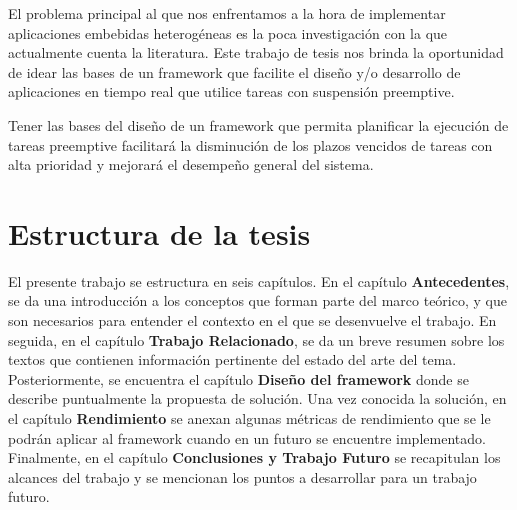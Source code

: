 El problema principal  al que nos enfrentamos a la hora de implementar aplicaciones embebidas heterogéneas es la poca investigación con la que actualmente cuenta la literatura. Este trabajo de tesis nos brinda la oportunidad de idear las bases de un framework que facilite el diseño y/o desarrollo de aplicaciones en tiempo real que utilice tareas con suspensión preemptive.
\newline

Tener las bases del diseño de un framework que permita planificar la ejecución de tareas preemptive facilitará la disminución de los plazos vencidos de tareas con alta prioridad y mejorará el desempeño general del sistema.

\section {Estructura de la tesis}

El presente trabajo se estructura en seis capítulos.
En el capítulo \textbf{Antecedentes}, se da una introducción a los conceptos que forman parte del marco teórico, y que son necesarios para entender el contexto en el que se desenvuelve el trabajo. En seguida, en el capítulo \textbf{Trabajo Relacionado}, se da un breve resumen sobre los textos que contienen información pertinente del estado del arte del tema. Posteriormente, se encuentra el capítulo \textbf{Diseño del framework} donde se describe puntualmente la propuesta de solución. Una vez conocida la solución, en el capítulo \textbf{Rendimiento} se anexan algunas métricas de rendimiento que se le podrán aplicar al framework cuando en un futuro se encuentre implementado. Finalmente, en el capítulo \textbf{Conclusiones y Trabajo Futuro} se recapitulan los alcances del trabajo y se mencionan los puntos a desarrollar para un trabajo futuro.

